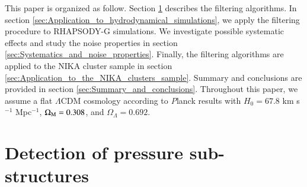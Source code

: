 \documentclass[twocolumn,traditabstract]{aa}
\begin{document}
This paper is organized as follow. Section \ref{sec:Pressure_substructures_detection} describes the filtering algorithms. In section \ref{sec:Application_to_hydrodynamical_simulations}, we apply the filtering procedure to RHAPSODY-G simulations. We investigate possible systematic effects and study the noise properties in section \ref{sec:Systematics_and_noise_properties}. Finally, the filtering algorithms are applied to the NIKA cluster sample in section \ref{sec:Application_to_the_NIKA_clusters_sample}. Summary and conclusions are provided in section \ref{sec:Summary_and_conclusions}. Throughout this paper, we assume a flat $\Lambda$CDM cosmology according to {\textit Planck} results \citep{Planck2016XIII} with $H_0 = 67.8$ km s$^{-1}$ Mpc$^{-1}$, $\Omega_{\rm M} = 0.308$, and $\Omega_{\Lambda} = 0.692$.

\section{Detection of pressure sub-structures}\label{sec:Pressure_substructures_detection}
\end{document}
